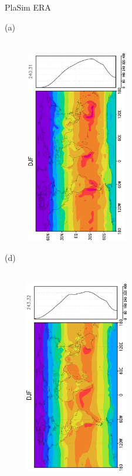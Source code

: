 \documentclass[12pt,a4paper,twoside,openright,headinclude,liststotoc,bibtotoc]{scrreprt}
\begin{document}
\begin{figure}[H]
\hspace{3.0cm}PlaSim \vspace{0.2cm}\hspace{7.2cm} ERA \\
\parbox{8.5cm}{\hspace{0.50cm}\begin{scriptsize}(a)\end{scriptsize} \vspace{-0.7cm} \\
\includegraphics[height=8.5cm,width=6.5cm,angle=-90]
{eps/zonalysmsolrad178DJF.eps}
}
\parbox{8.5cm}{\hspace{0.26cm}\begin{scriptsize}(d)\end{scriptsize} \vspace{-0.7cm} \\
\includegraphics[height=8.5cm,width=6.5cm,angle=-90]
{eps/zonalt21ysmsolradDJF.eps}
}
\end{figure}
\end{document}
